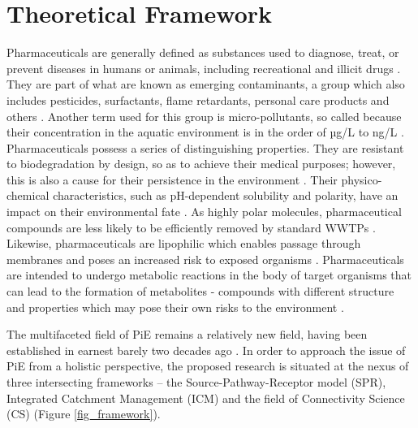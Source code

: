 \documentclass{article}
\begin{document}
\section{Theoretical Framework}
Pharmaceuticals are generally defined as substances used to diagnose, treat, or prevent diseases in humans or animals, including recreational and illicit drugs \citep{Quesada2019SurfaceReview}. They are part of what are known as emerging contaminants, a group which also includes pesticides, surfactants, flame retardants, personal care products and others \citep{ausderBeek2016PharmaceuticalsPerspectives,Vargas-Berrones2020Emerging-Nonylphenol-}. Another term used for this group is micro-pollutants, so called because their concentration in the aquatic environment is in the order of µg/L to ng/L \citep{Kummerer2009TheChallenges}.  
Pharmaceuticals possess a series of distinguishing properties. They are resistant to biodegradation by design, so as to achieve their medical purposes; however, this is also a cause for their persistence in the environment \citep{Fatta-Kassinos2011PharmaceuticalResearch}. Their physico-chemical characteristics, such as pH-dependent solubility and polarity, have an impact on their environmental fate \citep{Kummerer2009TheChallenges}. As highly polar molecules, pharmaceutical compounds are less likely to be efficiently removed by standard WWTPs \citep{Mompelat2009OccurrenceWater}. Likewise, pharmaceuticals are lipophilic which enables passage through membranes and poses an increased risk to exposed organisms \citep{UNEP2017PharmaceuticalsIssue}. Pharmaceuticals are intended to undergo metabolic reactions in the body of target organisms that can lead to the formation of metabolites - compounds with different structure and properties which may pose their own risks to the environment \citep{Quesada2019SurfaceReview}.  

The multifaceted field of PiE remains a relatively new field, having been established in earnest barely two decades ago \citep{Daughton2016PharmaceuticalsAnalysis}. In order to approach the issue of PiE from a holistic perspective, the proposed research is situated at the nexus of three intersecting frameworks – the Source-Pathway-Receptor model (SPR), Integrated Catchment Management (ICM) and the field of Connectivity Science (CS)  (Figure \ref{fig_framework}). 
\end{document}
